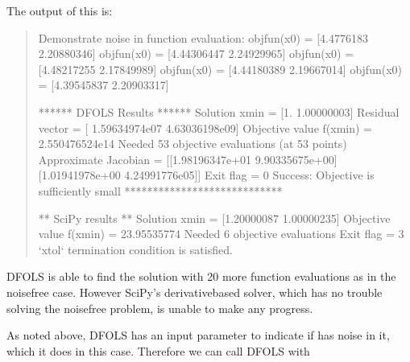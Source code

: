 \documentclass[letterpaper,10pt,english]{sphinxmanual}
\begin{document}
The output of this is:
\begin{quote}

\begin{sphinxVerbatim}[commandchars=\\\{\}]
Demonstrate noise in function evaluation:
objfun(x0) = [\PYGZhy{}4.4776183   2.20880346]
objfun(x0) = [\PYGZhy{}4.44306447  2.24929965]
objfun(x0) = [\PYGZhy{}4.48217255  2.17849989]
objfun(x0) = [\PYGZhy{}4.44180389  2.19667014]
objfun(x0) = [\PYGZhy{}4.39545837  2.20903317]

****** DFO\PYGZhy{}LS Results ******
Solution xmin = [1.         1.00000003]
Residual vector = [ 1.59634974e\PYGZhy{}07 \PYGZhy{}4.63036198e\PYGZhy{}09]
Objective value f(xmin) = 2.550476524e\PYGZhy{}14
Needed 53 objective evaluations (at 53 points)
Approximate Jacobian = [[\PYGZhy{}1.98196347e+01  9.90335675e+00]
 [\PYGZhy{}1.01941978e+00  4.24991776e\PYGZhy{}05]]
Exit flag = 0
Success: Objective is sufficiently small
****************************


** SciPy results **
Solution xmin = [\PYGZhy{}1.20000087  1.00000235]
Objective value f(xmin) = 23.95535774
Needed 6 objective evaluations
Exit flag = 3
`xtol` termination condition is satisfied.
\end{sphinxVerbatim}
\end{quote}

DFO\sphinxhyphen{}LS is able to find the solution with 20 more function evaluations as in the noise\sphinxhyphen{}free case. However SciPy’s derivative\sphinxhyphen{}based solver, which has no trouble solving the noise\sphinxhyphen{}free problem, is unable to make any progress.

As noted above, DFO\sphinxhyphen{}LS has an input parameter  to indicate if  has noise in it, which it does in this case. Therefore we can call DFO\sphinxhyphen{}LS with
\begin{quote}

\begin{sphinxVerbatim}[commandchars=\\\{\}]
    
\end{sphinxVerbatim}
\end{quote}
\end{document}
